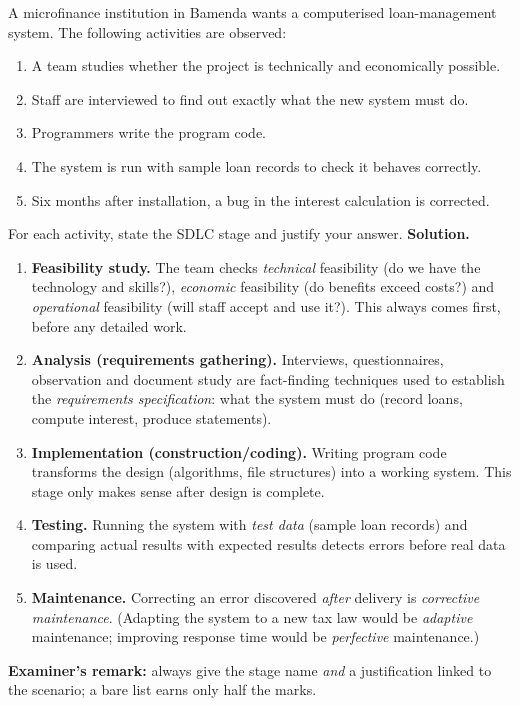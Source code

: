 \documentclass[11pt]{article}
\begin{document}
\begin{exoresolu}
A microfinance institution in Bamenda wants a computerised loan-management system. The following activities are observed:
\begin{enumerate}
\item[(a)] A team studies whether the project is technically and economically possible.
\item[(b)] Staff are interviewed to find out exactly what the new system must do.
\item[(c)] Programmers write the program code.
\item[(d)] The system is run with sample loan records to check it behaves correctly.
\item[(e)] Six months after installation, a bug in the interest calculation is corrected.
\end{enumerate}
For each activity, state the SDLC stage and justify your answer.
\tcblower
\textbf{Solution.}
\begin{enumerate}
\item[(a)] \textbf{Feasibility study.} The team checks \emph{technical} feasibility (do we have the technology and skills?), \emph{economic} feasibility (do benefits exceed costs?) and \emph{operational} feasibility (will staff accept and use it?). This always comes first, before any detailed work.
\item[(b)] \textbf{Analysis (requirements gathering).} Interviews, questionnaires, observation and document study are fact-finding techniques used to establish the \emph{requirements specification}: what the system must do (record loans, compute interest, produce statements).
\item[(c)] \textbf{Implementation (construction/coding).} Writing program code transforms the design (algorithms, file structures) into a working system. This stage only makes sense after design is complete.
\item[(d)] \textbf{Testing.} Running the system with \emph{test data} (sample loan records) and comparing actual results with expected results detects errors before real data is used.
\item[(e)] \textbf{Maintenance.} Correcting an error discovered \emph{after} delivery is \emph{corrective maintenance}. (Adapting the system to a new tax law would be \emph{adaptive} maintenance; improving response time would be \emph{perfective} maintenance.)
\end{enumerate}
\textbf{Examiner's remark:} always give the stage name \emph{and} a justification linked to the scenario; a bare list earns only half the marks.
\end{exoresolu}
\end{document}
